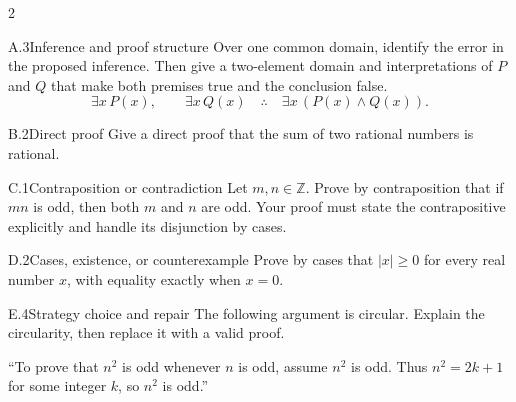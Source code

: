 \documentclass[9pt]{extarticle}
\begin{document}
\begin{multicols}{2}
\begin{CoreProblem}{A.3}{Inference and proof structure}
Over one common domain, identify the error in the proposed inference. Then give
a two-element domain and interpretations of $P$ and $Q$ that make both premises
true and the conclusion false.
\[
\exists x\,P(x),\qquad \exists x\,Q(x)
\quad\therefore\quad
\exists x\,(P(x)\land Q(x)).
\]
\end{CoreProblem}
\begin{CoreProblem}{B.2}{Direct proof}
Give a direct proof that the sum of two rational numbers is rational.
\end{CoreProblem}
\begin{CoreProblem}{C.1}{Contraposition or contradiction}
Let $m,n\in\mathbb Z$. Prove by contraposition that if $mn$ is odd, then both
$m$ and $n$ are odd. Your proof must state the contrapositive explicitly and
handle its disjunction by cases.
\end{CoreProblem}
\columnbreak
\begin{CoreProblem}{D.2}{Cases, existence, or counterexample}
Prove by cases that $|x|\ge 0$ for every real number $x$, with equality exactly when $x=0$.
\end{CoreProblem}
\begin{CoreProblem}{E.4}{Strategy choice and repair}
The following argument is circular. Explain the circularity, then replace it with a valid proof.

``To prove that $n^2$ is odd whenever $n$ is odd, assume $n^2$ is odd. Thus
$n^2=2k+1$ for some integer $k$, so $n^2$ is odd.''
\end{CoreProblem}
\end{multicols}
\CoreWorkArea
\FormBreak
{}
\end{document}
